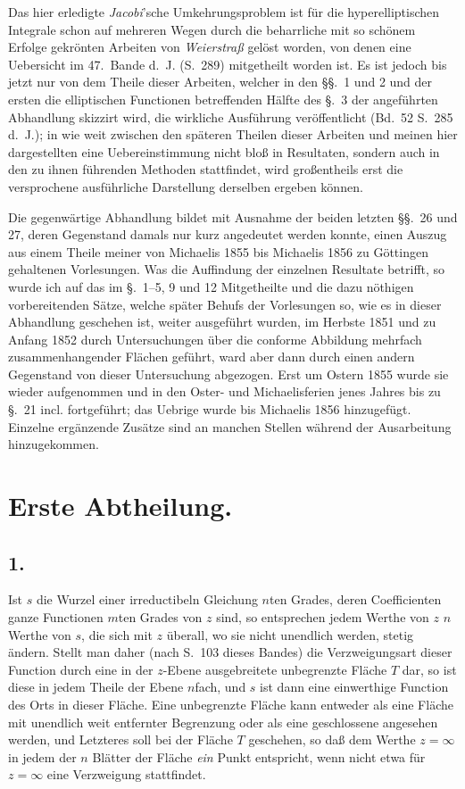 \documentclass{article}
\begin{document}
Das hier erledigte \emph{Jacobi}'sche Umkehrungsproblem ist für die hyperelliptischen Integrale schon auf mehreren Wegen durch die beharrliche mit so schönem Erfolge gekrönten Arbeiten von \emph{Weierstraß} gelöst worden, von denen eine Uebersicht im 47.~Bande d.~J. (S.~289) mitgetheilt worden ist. Es ist jedoch bis jetzt nur von dem Theile dieser Arbeiten, welcher in den §§.~1 und 2 und der ersten die elliptischen Functionen betreffenden Hälfte des §.~3 der angeführten Abhandlung skizzirt wird, die wirkliche Ausführung veröffentlicht (Bd.~52 S.~285 d.~J.); in wie weit zwischen den späteren Theilen dieser Arbeiten und meinen hier dargestellten eine Uebereinstimmung nicht bloß in Resultaten, sondern auch in den zu ihnen führenden Methoden stattfindet, wird großentheils erst die versprochene ausführliche Darstellung derselben ergeben können.

Die gegenwärtige Abhandlung bildet mit Ausnahme der beiden letzten §§.~26 und 27, deren Gegenstand damals nur kurz angedeutet werden konnte, einen Auszug aus einem Theile meiner von Michaelis 1855 bis Michaelis 1856 zu Göttingen gehaltenen Vorlesungen. Was die Auffindung der einzelnen Resultate betrifft, so wurde ich auf das im §.~1–5, 9 und 12 Mitgetheilte und die dazu nöthigen vorbereitenden Sätze, welche später Behufs der Vorlesungen so, wie es in dieser Abhandlung geschehen ist, weiter ausgeführt wurden, im Herbste 1851 und zu Anfang 1852 durch Untersuchungen über die conforme Abbildung mehrfach zusammenhangender Flächen geführt, ward aber dann durch einen andern Gegenstand von dieser Untersuchung abgezogen. Erst um Ostern 1855 wurde sie wieder aufgenommen und in den Oster- und Michaelisferien jenes Jahres bis zu §.~21 incl. fortgeführt; das Uebrige wurde bis Michaelis 1856 hinzugefügt. Einzelne ergänzende Zusätze sind an manchen Stellen während der Ausarbeitung hinzugekommen.

\section*{Erste Abtheilung.}

\subsection*{1.}

Ist $s$ die Wurzel einer irreductibeln Gleichung $n$ten Grades, deren Coefficienten ganze Functionen $m$ten Grades von $z$ sind, so entsprechen jedem Werthe von $z$ $n$ Werthe von $s$, die sich mit $z$ überall, wo sie nicht unendlich werden, stetig ändern. Stellt man daher (nach S.~103 dieses Bandes) die Verzweigungsart dieser Function durch eine in der $z$-Ebene ausgebreitete unbegrenzte Fläche $T$ dar, so ist diese in jedem Theile der Ebene $n$fach, und $s$ ist dann eine einwerthige Function des Orts in dieser Fläche. Eine unbegrenzte Fläche kann entweder als eine Fläche mit unendlich weit entfernter Begrenzung oder als eine geschlossene angesehen werden, und Letzteres soll bei der Fläche $T$ geschehen, so daß dem Werthe $z = \infty$ in jedem der $n$ Blätter der Fläche \emph{ein} Punkt entspricht, wenn nicht etwa für $z = \infty$ eine Verzweigung stattfindet.
\end{document}

